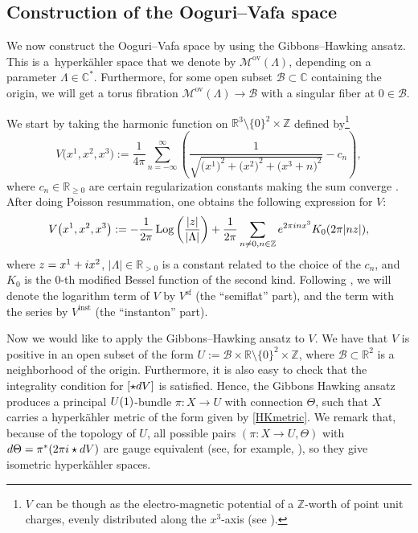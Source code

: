 \documentclass[11pt]{article}
\numberwithin{equation}{section}
\numberwithin{equation}{section}
\begin{document}
\subsection{Construction of the Ooguri--Vafa space}\label{constructionOV}

We now construct the Ooguri--Vafa space by using the Gibbons--Hawking ansatz. This is a~hyperk\"ahler space that we denote by $\mathcal{M}^{\text{ov}}(\Lambda)$, depending on a parameter $\Lambda \in \mathbb{C}^*$. Furthermore, for some open subset $\mathcal{B}\subset \mathbb{C}$ containing the origin, we will get a torus fibration $\mathcal{M}^{\text{ov}}(\Lambda)\to \mathcal{B}$ with a singular fiber at $0 \in \mathcal{B}$.

We start by taking the harmonic function on $\mathbb{R}^3\setminus \{0\}^{2}\times \mathbb{Z}$ defined by\footnote{$V$ can be though as the electro-magnetic potential of a $\mathbb{Z}$-worth of point unit charges, evenly distributed along the $x^3$-axis (see \cite{OV}).}
\begin{equation*}
 V\bigl(x^1,x^2,x^3\bigr):=\frac{1}{4\pi}\sum_{n=-\infty}^{\infty}\left(\frac{1}{\sqrt{\bigl(x^1\bigr)^2+\bigl(x^2\bigr)^2+\bigl(x^3+n\bigr)^2}} -c_n\right),
\end{equation*}
where $c_n \in \mathbb{R}_{\geq 0}$ are certain regularization constants making the sum converge \cite{OV}. After doing Poisson resummation, one obtains the following expression for $V$:
\begin{equation*}
 V\bigl(x^1,x^2,x^3\bigr):=-\frac{1}{2\pi}\operatorname{Log}\left(\frac{|z|}{|\Lambda|}\right)+\frac{1}{2\pi}\sum_{n\neq 0, n\in \mathbb{Z}} {\rm e}^{2\pi {\rm i}n x^3}K_0(2\pi|nz|),
\end{equation*}
where $z=x^1+{\rm i}x^2$, $|\Lambda| \in \mathbb{R}_{>0}$ is a constant related to the choice of the $c_n$, and $K_0$ is the $0$-th modified Bessel function of the second kind. Following \cite{GMN1}, we will denote the logarithm term of $V$ by $V^{\text{sf}}$ (the ``semiflat'' part), and the term with the series by $V^{\text{inst}}$ (the ``instanton'' part).


Now we would like to apply the Gibbons--Hawking ansatz to $V$. We have that $V$ is positive in an open subset of the form $U:=\mathcal{B}\times \mathbb{R}\setminus \{0\}^2\times \mathbb{Z}$, where $\mathcal{B}\subset \mathbb{R}^2$ is a neighborhood of the origin. Furthermore, it is also easy to check that the integrality condition for $[\star {\rm d}V]$ is satisfied. Hence, the Gibbons Hawking ansatz produces a principal ${\rm U}(1)$-bundle $\pi\colon X\to U$ with connection $\Theta$, such that $X$ carries a hyperk\"ahler metric of the form given by \eqref{HKmetric}. We remark that, because of the topology of $U$, all possible pairs $(\pi\colon X\to U,\Theta)$ with ${\rm d}\Theta=\pi^*(2\pi {\rm i} \star {\rm d}V)$ are gauge equivalent (see, for example, \cite[Theorem 2.5.1]{Kostant}), so they give isometric hyperk\"ahler spaces.
\end{document}
